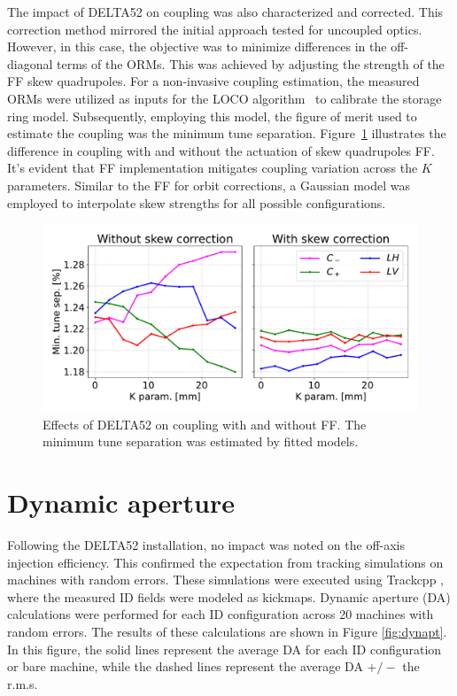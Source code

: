 \documentclass[a4paper,
               keeplastbox,   %
               ]{jacow}
\begin{document}
The impact of DELTA52 on coupling was also characterized and corrected. This correction method mirrored the initial approach tested for uncoupled optics. However, in this case, the objective was to minimize differences in the off-diagonal terms of the ORMs. This was achieved by adjusting the strength of the FF skew quadrupoles. For a non-invasive coupling estimation, the measured ORMs were utilized as inputs for the LOCO algorithm~\cite{Safranek} to calibrate the storage ring model. Subsequently, employing this model, the figure of merit used to estimate the coupling was the minimum tune separation. Figure~\ref{fig:coupling} illustrates the difference in coupling with and without the actuation of skew quadrupoles FF. It's evident that FF implementation mitigates coupling variation across the $K$ parameters. Similar to the FF for orbit corrections, a Gaussian model was employed to interpolate skew strengths for all possible configurations.
 
\begin{figure}[]
    \centering
   \includegraphics[width=.9\columnwidth]{THPS18_f5.pdf}
   \caption{Effects of DELTA52 on coupling with and without FF. The minimum tune separation was estimated by fitted models.}
   \label{fig:coupling}
\end{figure}


\section{Dynamic aperture}

Following the DELTA52 installation, no impact was noted on the off-axis injection efficiency. This confirmed the expectation from tracking simulations on machines with random errors. These simulations were executed using Trackcpp \cite{Trackcpp}, where the measured ID fields were modeled as kickmaps. Dynamic aperture (DA) calculations were performed for each ID configuration across 20 machines with random errors. The results of these calculations are shown in Figure \ref{fig:dynapt}. In this figure, the solid lines represent the average DA for each ID configuration or bare machine, while the dashed lines represent the average DA $+/-$ the r.m.s.
\end{document}
